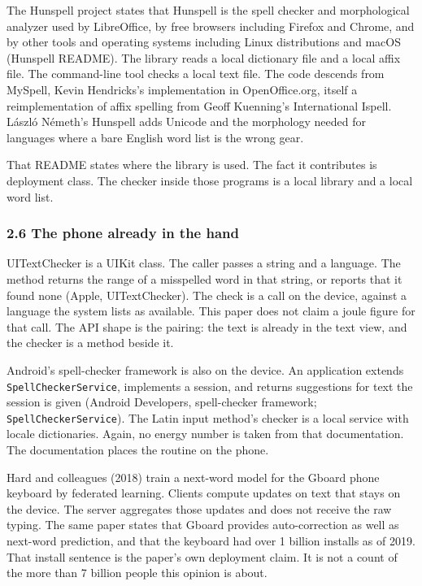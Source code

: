 \documentclass[
  10pt,
]{article}
\newcounter{none} %
\begin{document}
The Hunspell project states that Hunspell is the spell checker and
morphological analyzer used by LibreOffice, by free browsers including
Firefox and Chrome, and by other tools and operating systems including
Linux distributions and macOS (Hunspell README). The library reads a
local dictionary file and a local affix file. The command-line tool
checks a local text file. The code descends from MySpell, Kevin
Hendricks's implementation in OpenOffice.org, itself a reimplementation
of affix spelling from Geoff Kuenning's International Ispell. László
Németh's Hunspell adds Unicode and the morphology needed for languages
where a bare English word list is the wrong gear.

That README states where the library is used. The fact it contributes is
deployment class. The checker inside those programs is a local library
and a local word list.

\subsubsection{2.6 The phone already in the
hand}\label{the-phone-already-in-the-hand}

UITextChecker is a UIKit class. The caller passes a string and a
language. The method returns the range of a misspelled word in that
string, or reports that it found none (Apple, UITextChecker). The check
is a call on the device, against a language the system lists as
available. This paper does not claim a joule figure for that call. The
API shape is the pairing: the text is already in the text view, and the
checker is a method beside it.

Android's spell-checker framework is also on the device. An application
extends \texttt{SpellCheckerService}, implements a session, and returns
suggestions for text the session is given (Android Developers,
spell-checker framework; \texttt{SpellCheckerService}). The Latin input
method's checker is a local service with locale dictionaries. Again, no
energy number is taken from that documentation. The documentation places
the routine on the phone.

Hard and colleagues (2018) train a next-word model for the Gboard phone
keyboard by federated learning. Clients compute updates on text that
stays on the device. The server aggregates those updates and does not
receive the raw typing. The same paper states that Gboard provides
auto-correction as well as next-word prediction, and that the keyboard
had over 1 billion installs as of 2019. That install sentence is the
paper's own deployment claim. It is not a count of the more than 7
billion people this opinion is about.
\end{document}
